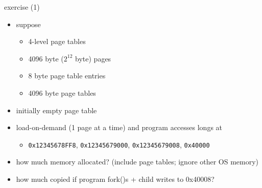 \begin{frame}{exercise (1)}
    \begin{itemize}
        \item suppose
            \begin{itemize}
            \item 4-level page tables
            \item 4096 byte ($2^{12}$ byte) pages
            \item 8 byte page table entries
            \item 4096 byte page tables
            \end{itemize}
        \item initially empty page table
        \item load-on-demand (1 page at a time) and program accesses longs at
            \begin{itemize}
                \item \texttt{0x12345678FF8}, \texttt{0x12345679000}, \texttt{0x12345679008}, \texttt{0x40000}
            \end{itemize}
        \item how much memory allocated?  (include page tables; ignore other OS memory)
        \item how much copied if program fork()s + child writes to 0x40008?
    \end{itemize}
\end{frame}

